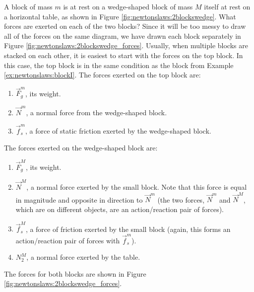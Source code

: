 \begin{example}{\label{ex:newtonslaws:2blockswedge}  A block of mass $m$ is at rest on a wedge-shaped block of mass $M$ itself at rest on a horizontal table, as shown in Figure \ref{fig:newtonslaws:2blockswedge}. What forces are exerted on each of the two blocks?}
Since it will be too messy to draw all of the forces on the same diagram, we have drawn each block separately in Figure \ref{fig:newtonslaws:2blockswedge_forces}. 
Usually, when multiple blocks are stacked on each other, it is easiest to start with the forces on the top block. In this case, the top block is in the same condition as the block from Example \ref{ex:newtonslaws:blockI}. The forces exerted on the top block are:
\begin{enumerate}
\item $\vec F_g^m$, its weight.
\item $\vec N^m$, a normal force from the wedge-shaped block.
\item $\vec f_s^m$, a force of static friction exerted by the wedge-shaped block.
\end{enumerate}
The forces exerted on the wedge-shaped block are:
\begin{enumerate}
\item $\vec F_g^M$, its weight.
\item $\vec N^M$, a normal force exerted by the small block. Note that this force is equal in magnitude and opposite in direction to $\vec N^m$ (the two forces, $\vec N^m$ and $\vec N^M$, which are on different objects, are an action/reaction pair of forces).
\item $\vec f_s^M$, a force of friction exerted by the small block (again, this forms an action/reaction pair of forces with  $\vec f_s^m$). 
\item $N_2^M$, a normal force exerted by the table.
\end{enumerate}
The forces for both blocks are shown in Figure \ref{fig:newtonslaws:2blockswedge_forces}.
\end{example}

